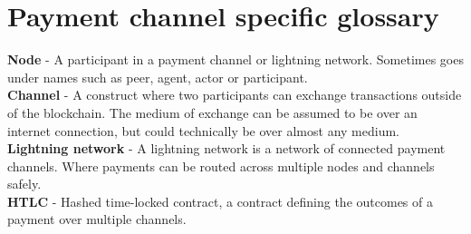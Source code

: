 \documentclass[11pt, titlepage, oneside, a4paper]{report}
\begin{document}
\vspace{-5mm}
\section*{Payment channel specific glossary}\vspace{-5mm}
\textbf{Node} - A participant in a payment channel or lightning network. Sometimes goes under names such as peer, agent, actor or participant.\\
\textbf{Channel} - A construct where two participants can exchange transactions outside of the blockchain. The medium of exchange can be assumed to be over an internet connection, but could technically be over almost any medium. \\
\textbf{Lightning network} - A lightning network is a network of connected payment channels. Where payments can be routed across multiple nodes and channels safely.\\
\textbf{HTLC} - Hashed time-locked contract, a contract defining the outcomes of a payment over multiple channels.\\

\tableofcontents
\thispagestyle{empty}
\newpage
{}
\setcounter{page}{1}
\setcounter{section}{0}















\twocolumn


\onecolumn


\end{document}
